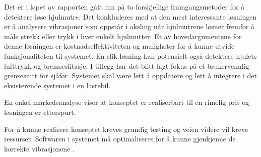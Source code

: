 Det er i løpet av rapporten gått inn på to forskjellige framgangsmetoder for å detektere
løse hjulmutre. Det konkluderes med at den mest interessante løsningen er å analysere
vibrasjoner som oppstår i aksling når hjulmutrene løsner fremfor å måle strekk eller trykk i 
hver enkelt hjulmutter. Et av hovedargumentene for denne løsningen er kostnadseffektiviteten og 
muligheter for å kunne utvide funksjonaliteten til systemet. En slik løsning kan potensielt 
også detektere hjulets lufttrykk og bremseslitasje. I tillegg har det blitt lagt fokus på et 
brukervennlig grensesnitt for sjåfør. Systemet skal være lett å oppdatere og lett å integrere 
i det eksisterende systemet i en lastebil. 

En enkel markedsanalyse viser at konseptet er realiserbart til en rimelig pris og 
løsningen er etterspurt. 

For å kunne realisere konseptet kreves grundig testing og veien videre vil kreve
ressurser. Softwaren i systemet må optimaliseres for å kunne gjenkjenne de korrekte
vibrasjonene .